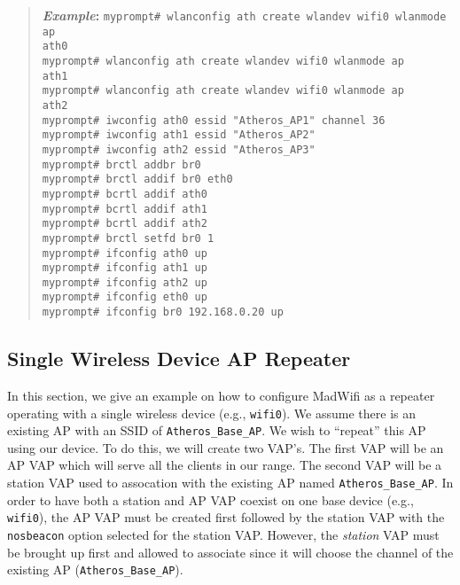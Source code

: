 \documentclass[10pt,fullpage]{article}
\newcommand{\mytt}[1]{{\texttt{#1}}}
\newcommand{\cmd}[1]{{\texttt{myprompt\# #1}}}
\newenvironment{example}{\begin{quote}\textbf{\textit{Example}:}}{\end{quote}}
\begin{document}
\begin{example}
  \cmd{wlanconfig ath create wlandev wifi0 wlanmode ap}\\
  \mytt{ath0}\\
  \cmd{wlanconfig ath create wlandev wifi0 wlanmode ap}\\
  \mytt{ath1}\\
  \cmd{wlanconfig ath create wlandev wifi0 wlanmode ap}\\
  \mytt{ath2}\\
  \cmd{iwconfig ath0 essid "Atheros\_AP1" channel 36}\\
  \cmd{iwconfig ath1 essid "Atheros\_AP2"}\\
  \cmd{iwconfig ath2 essid "Atheros\_AP3"}\\
  \cmd{brctl addbr br0}\\
  \cmd{brctl addif br0 eth0}\\
  \cmd{bcrtl addif ath0}\\
  \cmd{bcrtl addif ath1}\\
  \cmd{bcrtl addif ath2}\\
  \cmd{brctl setfd br0 1}\\
  \cmd{ifconfig ath0 up}\\
  \cmd{ifconfig ath1 up}\\
  \cmd{ifconfig ath2 up}\\
  \cmd{ifconfig eth0 up}\\
  \cmd{ifconfig br0 192.168.0.20 up}
\end{example}

\subsection{Single Wireless Device AP Repeater}
In this section, we give an example on how to configure MadWifi as a
repeater operating with a single wireless device (e.g., \mytt{wifi0}).
We assume there is an existing AP with an SSID of
\mytt{Atheros\_Base\_AP}.  We wish to ``repeat'' this AP using our
device.  To do this, we will create two VAP's.  The first VAP will be
an AP VAP which will serve all the clients in our range.  The second
VAP will be a station VAP used to assocation with the existing AP
named \mytt{Atheros\_Base\_AP}.  In order to have both a station and
AP VAP coexist on one base device (e.g., \mytt{wifi0}), the AP VAP
must be created first followed by the station VAP with the
\mytt{nosbeacon} option selected for the station VAP.  However, the
\emph{station} VAP must be brought up first and allowed to associate
since it will choose the channel of the existing AP
(\mytt{Atheros\_Base\_AP}).
\end{document}
